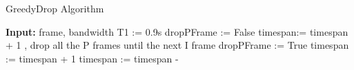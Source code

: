 \begin{algorithm}[tb]
\caption{GreedyDrop Algorithm}
\label{alg:greedy-drop}
\begin{algorithmic}[1]
\State \textbf{Input:} {frame, bandwidth}
\State T1 := 0.9s
\State dropPFrame := False
\State {}
\State timespan:= timespan + 1
\EndIf
{}
\State {}, drop all the P frames until the next I frame
\State dropPFrame := True
\Else
\State {}
\State timespan := timespan + 1
\EndIf
\EndIf
\State timespan := timespan - 
\end{algorithmic}
\end{algorithm} 